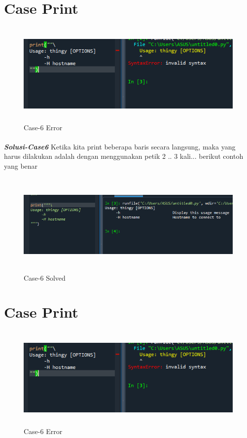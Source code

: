 \documentclass[12pt,a4paper]{article}
\begin{document}
\newpage
\section{Case Print}
\begin{figure}[ht]
    \centerline{\includegraphics[width=15cm,height=5cm]{image/case6.png}}
    \renewcommand{\figurename}{Gambar}
    \caption{Case-6 Error}
\end{figure}
\paragraph{}\textbf{\textit{Solusi-Case6}} {Ketika kita print beberapa baris secara langsung, maka yang harus dilakukan adalah dengan menggunakan petik 2 .. 3 kali... berikut contoh yang benar}
\begin{figure}[ht]
    \centerline{\includegraphics[width=15cm,height=5cm]{image/case6-solved.png}}
    \renewcommand{\figurename}{Gambar}
    \caption{Case-6 Solved}
\end{figure}

\newpage
\section{Case Print}
\begin{figure}[ht]
    \centerline{\includegraphics[width=15cm,height=5cm]{image/case6.png}}
    \renewcommand{\figurename}{Gambar}
    \caption{Case-6 Error}
\end{figure}
\end{document}
